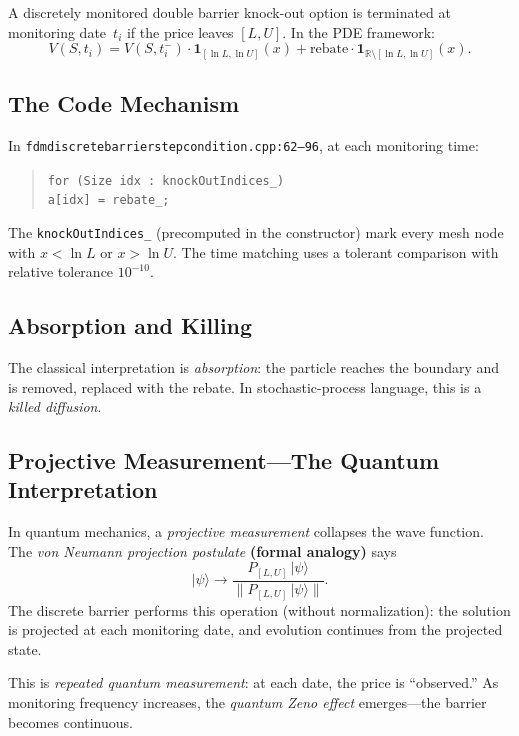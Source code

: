 A discretely monitored double barrier knock-out option is terminated at monitoring date~$t_i$ if the price leaves $[L, U]$.  In the PDE framework:
\begin{equation}\label{eq:barrier-reset}
  V(S, t_i) = V(S, t_i^-) \cdot \mathbf{1}_{[\ln L, \ln U]}(x)
             + \text{rebate} \cdot \mathbf{1}_{\mathbb{R}\setminus[\ln L,\ln U]}(x).
\end{equation}

\subsection{The Code Mechanism}

In \texttt{fdmdiscretebarrierstepcondition.cpp:62--96}, at each monitoring time:
\begin{quote}
\small\texttt{for (Size idx : knockOutIndices\_)}\\
\texttt{\quad a[idx] = rebate\_;}
\end{quote}
The \texttt{knockOutIndices\_} (precomputed in the constructor) mark every mesh node with $x < \ln L$ or $x > \ln U$.  The time matching uses a tolerant comparison with relative tolerance $10^{-10}$.

\subsection{Absorption and Killing}

The classical interpretation is \emph{absorption}: the particle reaches the boundary and is removed, replaced with the rebate.  In stochastic-process language, this is a \emph{killed diffusion}.

\subsection{Projective Measurement---The Quantum Interpretation}

In quantum mechanics, a \emph{projective measurement} collapses the wave function.  The \emph{von Neumann projection postulate} \textbf{(formal analogy)} says
\begin{equation}\label{eq:projection}
  |\psi\rangle \to \frac{P_{[L,U]}\,|\psi\rangle}{\|P_{[L,U]}\,|\psi\rangle\|}.
\end{equation}
The discrete barrier performs this operation (without normalization): the solution is projected at each monitoring date, and evolution continues from the projected state.

This is \emph{repeated quantum measurement}: at each date, the price is ``observed.''  As monitoring frequency increases, the \emph{quantum Zeno effect} emerges---the barrier becomes continuous.

